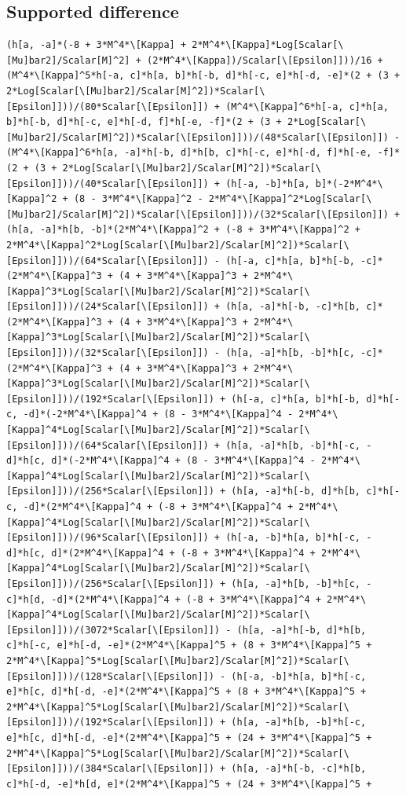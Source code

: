 \documentclass[11pt]{article}
\begin{document}
\subsection{Supported difference}
\begin{verbatim}
(h[a, -a]*(-8 + 3*M^4*\[Kappa] + 2*M^4*\[Kappa]*Log[Scalar[\[Mu]bar2]/Scalar[M]^2] + (2*M^4*\[Kappa])/Scalar[\[Epsilon]]))/16 + (M^4*\[Kappa]^5*h[-a, c]*h[a, b]*h[-b, d]*h[-c, e]*h[-d, -e]*(2 + (3 + 2*Log[Scalar[\[Mu]bar2]/Scalar[M]^2])*Scalar[\[Epsilon]]))/(80*Scalar[\[Epsilon]]) + (M^4*\[Kappa]^6*h[-a, c]*h[a, b]*h[-b, d]*h[-c, e]*h[-d, f]*h[-e, -f]*(2 + (3 + 2*Log[Scalar[\[Mu]bar2]/Scalar[M]^2])*Scalar[\[Epsilon]]))/(48*Scalar[\[Epsilon]]) - (M^4*\[Kappa]^6*h[a, -a]*h[-b, d]*h[b, c]*h[-c, e]*h[-d, f]*h[-e, -f]*(2 + (3 + 2*Log[Scalar[\[Mu]bar2]/Scalar[M]^2])*Scalar[\[Epsilon]]))/(40*Scalar[\[Epsilon]]) + (h[-a, -b]*h[a, b]*(-2*M^4*\[Kappa]^2 + (8 - 3*M^4*\[Kappa]^2 - 2*M^4*\[Kappa]^2*Log[Scalar[\[Mu]bar2]/Scalar[M]^2])*Scalar[\[Epsilon]]))/(32*Scalar[\[Epsilon]]) + (h[a, -a]*h[b, -b]*(2*M^4*\[Kappa]^2 + (-8 + 3*M^4*\[Kappa]^2 + 2*M^4*\[Kappa]^2*Log[Scalar[\[Mu]bar2]/Scalar[M]^2])*Scalar[\[Epsilon]]))/(64*Scalar[\[Epsilon]]) - (h[-a, c]*h[a, b]*h[-b, -c]*(2*M^4*\[Kappa]^3 + (4 + 3*M^4*\[Kappa]^3 + 2*M^4*\[Kappa]^3*Log[Scalar[\[Mu]bar2]/Scalar[M]^2])*Scalar[\[Epsilon]]))/(24*Scalar[\[Epsilon]]) + (h[a, -a]*h[-b, -c]*h[b, c]*(2*M^4*\[Kappa]^3 + (4 + 3*M^4*\[Kappa]^3 + 2*M^4*\[Kappa]^3*Log[Scalar[\[Mu]bar2]/Scalar[M]^2])*Scalar[\[Epsilon]]))/(32*Scalar[\[Epsilon]]) - (h[a, -a]*h[b, -b]*h[c, -c]*(2*M^4*\[Kappa]^3 + (4 + 3*M^4*\[Kappa]^3 + 2*M^4*\[Kappa]^3*Log[Scalar[\[Mu]bar2]/Scalar[M]^2])*Scalar[\[Epsilon]]))/(192*Scalar[\[Epsilon]]) + (h[-a, c]*h[a, b]*h[-b, d]*h[-c, -d]*(-2*M^4*\[Kappa]^4 + (8 - 3*M^4*\[Kappa]^4 - 2*M^4*\[Kappa]^4*Log[Scalar[\[Mu]bar2]/Scalar[M]^2])*Scalar[\[Epsilon]]))/(64*Scalar[\[Epsilon]]) + (h[a, -a]*h[b, -b]*h[-c, -d]*h[c, d]*(-2*M^4*\[Kappa]^4 + (8 - 3*M^4*\[Kappa]^4 - 2*M^4*\[Kappa]^4*Log[Scalar[\[Mu]bar2]/Scalar[M]^2])*Scalar[\[Epsilon]]))/(256*Scalar[\[Epsilon]]) + (h[a, -a]*h[-b, d]*h[b, c]*h[-c, -d]*(2*M^4*\[Kappa]^4 + (-8 + 3*M^4*\[Kappa]^4 + 2*M^4*\[Kappa]^4*Log[Scalar[\[Mu]bar2]/Scalar[M]^2])*Scalar[\[Epsilon]]))/(96*Scalar[\[Epsilon]]) + (h[-a, -b]*h[a, b]*h[-c, -d]*h[c, d]*(2*M^4*\[Kappa]^4 + (-8 + 3*M^4*\[Kappa]^4 + 2*M^4*\[Kappa]^4*Log[Scalar[\[Mu]bar2]/Scalar[M]^2])*Scalar[\[Epsilon]]))/(256*Scalar[\[Epsilon]]) + (h[a, -a]*h[b, -b]*h[c, -c]*h[d, -d]*(2*M^4*\[Kappa]^4 + (-8 + 3*M^4*\[Kappa]^4 + 2*M^4*\[Kappa]^4*Log[Scalar[\[Mu]bar2]/Scalar[M]^2])*Scalar[\[Epsilon]]))/(3072*Scalar[\[Epsilon]]) - (h[a, -a]*h[-b, d]*h[b, c]*h[-c, e]*h[-d, -e]*(2*M^4*\[Kappa]^5 + (8 + 3*M^4*\[Kappa]^5 + 2*M^4*\[Kappa]^5*Log[Scalar[\[Mu]bar2]/Scalar[M]^2])*Scalar[\[Epsilon]]))/(128*Scalar[\[Epsilon]]) - (h[-a, -b]*h[a, b]*h[-c, e]*h[c, d]*h[-d, -e]*(2*M^4*\[Kappa]^5 + (8 + 3*M^4*\[Kappa]^5 + 2*M^4*\[Kappa]^5*Log[Scalar[\[Mu]bar2]/Scalar[M]^2])*Scalar[\[Epsilon]]))/(192*Scalar[\[Epsilon]]) + (h[a, -a]*h[b, -b]*h[-c, e]*h[c, d]*h[-d, -e]*(2*M^4*\[Kappa]^5 + (24 + 3*M^4*\[Kappa]^5 + 2*M^4*\[Kappa]^5*Log[Scalar[\[Mu]bar2]/Scalar[M]^2])*Scalar[\[Epsilon]]))/(384*Scalar[\[Epsilon]]) + (h[a, -a]*h[-b, -c]*h[b, c]*h[-d, -e]*h[d, e]*(2*M^4*\[Kappa]^5 + (24 + 3*M^4*\[Kappa]^5 + 
\end{verbatim}
\end{document}
